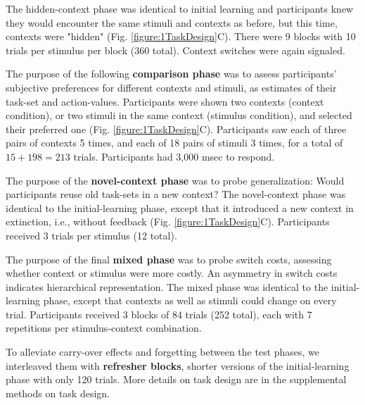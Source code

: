 \documentclass[10pt,letterpaper]{article}  %
\begin{document}
The hidden-context phase was identical to initial learning and participants knew they would encounter the same stimuli and contexts as before, but this time, contexts were "hidden" (Fig. \ref{figure:1TaskDesign}C). There were 9 blocks with 10 trials per stimulus per block (360 total). %
Context switches were again signaled.

The purpose of the following \textbf{comparison phase} was to assess participants' subjective preferences for different contexts and stimuli, as estimates of their task-set and action-values.
Participants were shown two contexts (context condition), or two stimuli in the same context (stimulus condition), and selected their preferred one (Fig. \ref{figure:1TaskDesign}C). Participants saw each of three pairs of contexts 5 times, and each of 18 pairs of stimuli 3 times, for a total of $15+198=213$ trials. Participants had 3,000 msec to respond.

The purpose of the \textbf{novel-context phase} was to probe generalization: Would participants reuse old task-sets in a new context?
The novel-context phase was identical to the initial-learning phase, except that it introduced a new context in extinction, i.e., without feedback (Fig. \ref{figure:1TaskDesign}C). Participants received 3 trials per stimulus (12 total). 

The purpose of the final \textbf{mixed phase} was to probe switch costs, assessing whether context or stimulus were more costly. An asymmetry in switch costs indicates hierarchical representation.
The mixed phase was identical to the initial-learning phase, except that contexts as well as stimuli could change on every trial. Participants received 3 blocks of 84 trials (252 total), each with 7 repetitions per stimulus-context combination.

To alleviate carry-over effects and forgetting between the test phases, we interleaved them with \textbf{refresher blocks}, shorter versions of the initial-learning phase with only 120 trials.
More details on task design are in the supplemental methods on task design.
\end{document}
